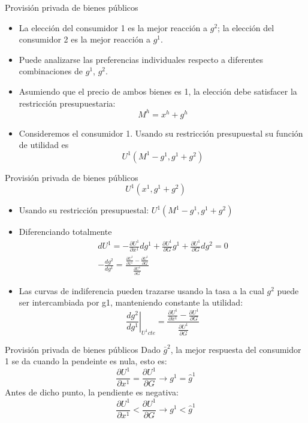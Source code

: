 \begin{frame}{Provisión privada de bienes públicos}
	\begin{itemize}
		\item La elección del consumidor 1 es la mejor reacción a $g^2$; la elección del consumidor 2 es la mejor reacción a $g^1$.
		\item Puede analizarse las preferencias individuales respecto a diferentes combinaciones de $g^1$, $g^2$.
		\item Asumiendo que el precio de ambos bienes es 1, la elección debe satisfacer la restricción presupuestaria:
				$$M^h = x^h + g^h$$
		\item Consideremos el consumidor 1. Usando su restricción presupuestal su función de utilidad es
				$$U^1\left( M^1 - g^1, g^1 + g^2\right)$$
	\end{itemize}
\end{frame}
\begin{frame}{Provisión privada de bienes públicos}
	$$U^1\left( x^1, g^1 + g^2\right)$$
		\begin{itemize}
			\item Usando su restricción presupuestal: $U^1\left( M^1 - g^1, g^1 + g^2\right)$
			\item Diferenciando totalmente
					\begin{gather*}
						dU^1 = -\frac{\partial U^1}{\partial x^1}dg^1+\frac{\partial U^1}{\partial G}g^1 + \frac{\partial U^1}{\partial G}dg^2 = 0\\[0.3cm]
						-\frac{dg^2}{dg^1} = \frac{\frac{\partial U^1}{\partial x^1} - \frac{\partial U^1}{\partial G}}{\frac{\partial U^1}{\partial G}}
					\end{gather*}
			\item Las curvas de indiferencia pueden trazarse usando la tasa a la cual $g^2$ puede ser intercambiada por g1, manteniendo constante la utilidad:
					$$\left. \frac{dg^2}{dg^1}\right|_{U^1 cte} = \frac{\frac{\partial U^1}{\partial x^1} - \frac{\partial U^1}{\partial G}}{\frac{\partial U^1}{\partial G}}$$
		\end{itemize}
\end{frame}
\begin{frame}{Provisión privada de bienes públicos}
	Dado $\bar{g}^2$, la mejor respuesta del consumidor 1 se da cuando la pendeinte es nula, esto es:
		$$\frac{\partial U^1}{\partial x^1} = \frac{\partial U^1}{\partial G} \rightarrow g^1 = \hat{g}^1$$
	Antes de dicho punto, la pendiente es negativa:
		$$\frac{\partial U^1}{\partial x^1} < \frac{\partial U^1}{\partial G} \rightarrow g^1 < \hat{g}^1$$
\end{frame}
